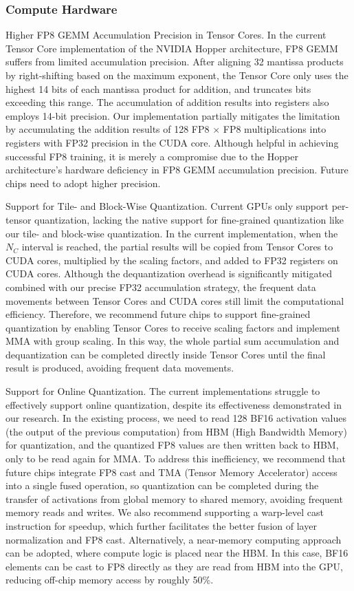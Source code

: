\documentclass[11pt,a4paper]{article}
\begin{document}
\subsubsection{Compute Hardware}

Higher FP8 GEMM Accumulation Precision in Tensor Cores. In the current Tensor Core implementation of the NVIDIA Hopper architecture, FP8 GEMM suffers from limited accumulation precision. After aligning 32 mantissa products by right-shifting based on the maximum exponent, the Tensor Core only uses the highest 14 bits of each mantissa product for addition, and truncates bits exceeding this range. The accumulation of addition results into registers also employs 14-bit precision. Our implementation partially mitigates the limitation by accumulating the addition results of 128 FP8 $\times$ FP8 multiplications into registers with FP32 precision in the CUDA core. Although helpful in achieving successful FP8 training, it is merely a compromise due to the Hopper architecture's hardware deficiency in FP8 GEMM accumulation precision. Future chips need to adopt higher precision.

Support for Tile- and Block-Wise Quantization. Current GPUs only support per-tensor quantization, lacking the native support for fine-grained quantization like our tile- and block-wise quantization. In the current implementation, when the  $N_C$  interval is reached, the partial results will be copied from Tensor Cores to CUDA cores, multiplied by the scaling factors, and added to FP32 registers on CUDA cores. Although the dequantization overhead is significantly mitigated combined with our precise FP32 accumulation strategy, the frequent data movements between Tensor Cores and CUDA cores still limit the computational efficiency. Therefore, we recommend future chips to support fine-grained quantization by enabling Tensor Cores to receive scaling factors and implement MMA with group scaling. In this way, the whole partial sum accumulation and dequantization can be completed directly inside Tensor Cores until the final result is produced, avoiding frequent data movements.

Support for Online Quantization. The current implementations struggle to effectively support online quantization, despite its effectiveness demonstrated in our research. In the existing process, we need to read 128 BF16 activation values (the output of the previous computation) from HBM (High Bandwidth Memory) for quantization, and the quantized FP8 values are then written back to HBM, only to be read again for MMA. To address this inefficiency, we recommend that future chips integrate FP8 cast and TMA (Tensor Memory Accelerator) access into a single fused operation, so quantization can be completed during the transfer of activations from global memory to shared memory, avoiding frequent memory reads and writes. We also recommend supporting a warp-level cast instruction for speedup, which further facilitates the better fusion of layer normalization and FP8 cast. Alternatively, a near-memory computing approach can be adopted, where compute logic is placed near the HBM. In this case, BF16 elements can be cast to FP8 directly as they are read from HBM into the GPU, reducing off-chip memory access by roughly 50\%.
\end{document}
